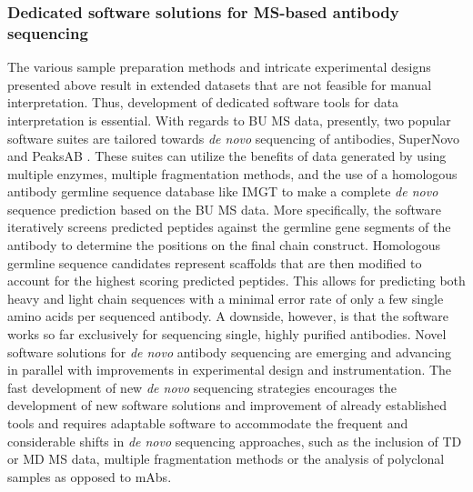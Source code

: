 \subsubsection{Dedicated software solutions for MS-based antibody sequencing}
The various sample preparation methods and intricate experimental designs presented above result in extended datasets that are not feasible for manual interpretation. Thus, development of dedicated software tools for data interpretation is essential.
With regards to BU MS data, presently, two popular software suites are tailored towards \emph{de novo} sequencing of antibodies, SuperNovo \cite{sen2017automated} and PeaksAB \cite{tran2016complete, ma2003peaks:}. These suites can utilize the benefits of data generated by using multiple enzymes, multiple fragmentation methods, and the use of a homologous antibody germline sequence database like IMGT to make a complete \emph{de novo} sequence prediction based on the BU MS data. More specifically, the software iteratively screens predicted peptides against the germline gene segments of the antibody to determine the positions on the final chain construct. Homologous germline sequence candidates represent scaffolds that are then modified to account for the highest scoring predicted peptides. This allows for predicting both heavy and light chain sequences with a minimal error rate of only a few single amino acids per sequenced antibody. A downside, however, is that the software works so far exclusively for sequencing single, highly purified antibodies.
Novel software solutions for \emph{de novo} antibody sequencing are emerging and advancing in parallel with improvements in experimental design and instrumentation. The fast development of new \emph{de novo} sequencing strategies encourages the development of new software solutions and improvement of already established tools and requires adaptable software to accommodate the frequent and considerable shifts in \emph{de novo} sequencing approaches, such as the inclusion of TD or MD MS data, multiple fragmentation methods or the analysis of polyclonal samples as opposed to mAbs.

